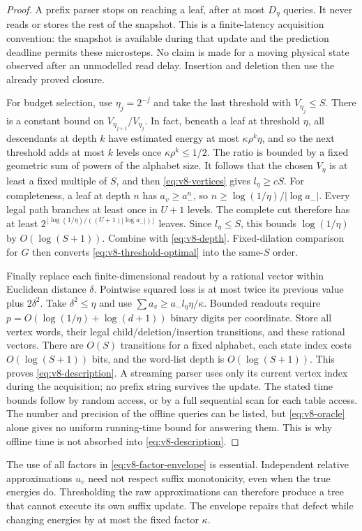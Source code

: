 \begin{proof}
A prefix parser stops on reaching a leaf, after at most $D_\eta$
queries. It never reads or stores the rest of the snapshot. This is a
finite-latency acquisition convention: the snapshot is available during
that update and the prediction deadline permits these microsteps. No
claim is made for a moving physical state observed after an unmodelled
read delay. Insertion and deletion then use the already proved closure.

For budget selection, use $\eta_j=2^{-j}$ and take the last threshold
with $V_{\eta_j}\le S$. There is a constant bound on
$V_{\eta_{j+1}}/V_{\eta_j}$. In fact, beneath a leaf at threshold $\eta$,
all descendants at depth $k$ have estimated energy at most
$\kappa\rho^k\eta$, and so the next threshold adds at most $k$ levels
once $\kappa\rho^k\le1/2$. The ratio is bounded by a fixed geometric
sum of powers of the alphabet size. It follows that the chosen
$V_\eta$ is at least a fixed multiple of $S$, and then
\eqref{eq:v8-vertices} gives $l_\eta\ge cS$.
For completeness, a leaf at depth $n$ has $a_v\ge a_-^n$, so
$n\ge\log(1/\eta)/|\log a_-|$. Every legal path branches at least once
in $U+1$ levels. The complete cut therefore has at least
$2^{\lfloor\log(1/\eta)/((U+1)|\log a_-|)\rfloor}$ leaves.
Since $l_\eta\le S$, this bounds $\log(1/\eta)$ by $O(\log(S+1))$.
Combine with \eqref{eq:v8-depth}. Fixed-dilation comparison for $G$
then converts \eqref{eq:v8-threshold-optimal} into the same-$S$ order.

Finally replace each finite-dimensional readout by a rational vector
within Euclidean distance $\delta$. Pointwise squared loss is at most
twice its previous value plus $2\delta^2$. Take $\delta^2\le\eta$ and
use $\sum a_v\ge a_-l_\eta\eta/\kappa$. Bounded readouts require
$p=O(\log(1/\eta)+\log(d+1))$ binary digits per coordinate. Store all
vertex words, their legal child/deletion/insertion transitions, and these
rational vectors. There are $O(S)$ transitions for a fixed alphabet,
each state index costs $O(\log(S+1))$ bits, and the word-list depth is
$O(\log(S+1))$. This proves \eqref{eq:v8-description}. A streaming
parser uses only its current vertex index during the acquisition;
no prefix string survives the update. The stated time bounds follow
by random access, or by a full sequential scan for each table access.
The number and precision of the offline queries can be listed, but
\eqref{eq:v8-oracle} alone gives no uniform running-time bound for
answering them. This is why offline time is not absorbed into
\eqref{eq:v8-description}.
\end{proof}

The use of all factors in \eqref{eq:v8-factor-envelope} is essential.
Independent relative approximations $u_v$ need not respect suffix
monotonicity, even when the true energies do. Thresholding the raw
approximations can therefore produce a tree that cannot execute its own
suffix update. The envelope repairs that defect while changing energies
by at most the fixed factor $\kappa$.
